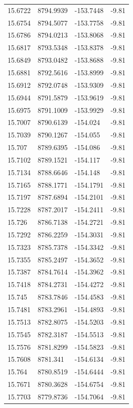 \begin{table}[H]
\begin{tabular}{llll}
15.6722 & 8794.9939 & -153.7448 & -9.81 \\
15.6754 & 8794.5077 & -153.7758 & -9.81 \\
15.6786 & 8794.0213 & -153.8068 & -9.81 \\
15.6817 & 8793.5348 & -153.8378 & -9.81 \\
15.6849 & 8793.0482 & -153.8688 & -9.81 \\
15.6881 & 8792.5616 & -153.8999 & -9.81 \\
15.6912 & 8792.0748 & -153.9309 & -9.81 \\
15.6944 & 8791.5879 & -153.9619 & -9.81 \\
15.6975 & 8791.1009 & -153.9929 & -9.81 \\
15.7007 & 8790.6139 & -154.024 & -9.81 \\
15.7039 & 8790.1267 & -154.055 & -9.81 \\
15.707 & 8789.6395 & -154.086 & -9.81 \\
15.7102 & 8789.1521 & -154.117 & -9.81 \\
15.7134 & 8788.6646 & -154.148 & -9.81 \\
15.7165 & 8788.1771 & -154.1791 & -9.81 \\
15.7197 & 8787.6894 & -154.2101 & -9.81 \\
15.7228 & 8787.2017 & -154.2411 & -9.81 \\
15.726 & 8786.7138 & -154.2721 & -9.81 \\
15.7292 & 8786.2259 & -154.3031 & -9.81 \\
15.7323 & 8785.7378 & -154.3342 & -9.81 \\
15.7355 & 8785.2497 & -154.3652 & -9.81 \\
15.7387 & 8784.7614 & -154.3962 & -9.81 \\
15.7418 & 8784.2731 & -154.4272 & -9.81 \\
15.745 & 8783.7846 & -154.4583 & -9.81 \\
15.7481 & 8783.2961 & -154.4893 & -9.81 \\
15.7513 & 8782.8075 & -154.5203 & -9.81 \\
15.7545 & 8782.3187 & -154.5513 & -9.81 \\
15.7576 & 8781.8299 & -154.5823 & -9.81 \\
15.7608 & 8781.341 & -154.6134 & -9.81 \\
15.764 & 8780.8519 & -154.6444 & -9.81 \\
15.7671 & 8780.3628 & -154.6754 & -9.81 \\
15.7703 & 8779.8736 & -154.7064 & -9.81 \\

\end{tabular}
\end{table}
